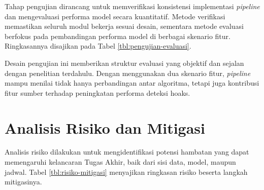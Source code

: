 Tahap pengujian dirancang untuk memverifikasi konsistensi implementasi \textit{pipeline} dan mengevaluasi performa model secara kuantitatif. Metode verifikasi memastikan seluruh modul bekerja sesuai desain, sementara metode evaluasi berfokus pada pembandingan performa model di berbagai skenario fitur. Ringkasannya disajikan pada Tabel \ref{tbl:pengujian-evaluasi}.



Desain pengujian ini memberikan struktur evaluasi yang objektif dan sejalan dengan penelitian terdahulu. Dengan menggunakan dua skenario fitur, \textit{pipeline} mampu menilai tidak hanya perbandingan antar algoritma, tetapi juga kontribusi fitur sumber terhadap peningkatan performa deteksi hoaks.

\section{Analisis Risiko dan Mitigasi}

Analisis risiko dilakukan untuk mengidentifikasi potensi hambatan yang dapat memengaruhi kelancaran Tugas Akhir, baik dari sisi data, model, maupun jadwal. Tabel \ref{tbl:risiko-mitigasi} menyajikan ringkasan risiko beserta langkah mitigasinya.


